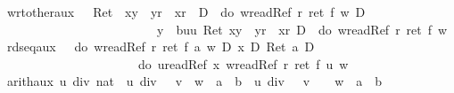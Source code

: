 \begin{isabellebody}
\isamarkupfalse%
\isamarkupfalse%
\isamarkupfalse%
\isanewline
\isanewline
\isamarkupfalse%
\ wrt{\isacharunderscore}other{}{\isacharunderscore}aux{\isacharcolon}\ \ {\isachardoublequote}{\isasymturnstile}\ Ret\ {\isacharparenleft}\ x{\isasymnoteq}y\ {\isasymand}\ y{\isasymnoteq}r\ {\isasymand}\ x{\isasymnoteq}r\ {\isacharparenright}\ {\isasymand}\isactrlsub D\ {\isasymUp}\ {\isacharparenleft}do\ {\isacharbraceleft}w{\isasymleftarrow}readRef\ r{\isacharsemicolon}\ ret\ {\isacharparenleft}f\ w{\isacharparenright}{\isacharbraceright}{\isacharparenright}\ {\isasymlongrightarrow}\isactrlsub D\ \isanewline
\ \ \ \ \ \ \ \ \ \ \ \ \ \ \ \ \ \ \ \ \ \ \ \ {\isacharbrackleft}{\isacharhash}\ y\ {\isacharcolon}{\isacharequal}\ b{\isacharbrackright}{\isacharparenleft}{\isasymlambda}uu{\isachardot}\ Ret\ {\isacharparenleft}x{\isasymnoteq}y\ {\isasymand}\ y{\isasymnoteq}r\ {\isasymand}\ x{\isasymnoteq}r{\isacharparenright}\ {\isasymand}\isactrlsub D\ {\isasymUp}\ {\isacharparenleft}do\ {\isacharbraceleft}w{\isasymleftarrow}readRef\ r{\isacharsemicolon}\ ret\ {\isacharparenleft}f\ w{\isacharparenright}{\isacharbraceright}{\isacharparenright}{\isacharparenright}{\isachardoublequote}\isamarkupfalse%
\isamarkupfalse%
\isamarkupfalse%
\isamarkupfalse%
\isamarkupfalse%
\isamarkupfalse%
\isamarkupfalse%
\isanewline
\isanewline
\isamarkupfalse%
\ rd{\isacharunderscore}seq{\isacharunderscore}aux{\isacharcolon}\ {\isachardoublequote}{\isasymturnstile}\ {\isasymUp}\ {\isacharparenleft}do\ {\isacharbraceleft}w{\isasymleftarrow}readRef\ r{\isacharsemicolon}\ ret\ {\isacharparenleft}f\ a\ w{\isacharparenright}{\isacharbraceright}{\isacharparenright}\ {\isasymand}\isactrlsub D\ {\isacharasterisk}x\ {\isacharequal}\isactrlsub D\ Ret\ a\ {\isasymlongrightarrow}\isactrlsub D\isanewline
\ \ \ \ \ \ \ \ \ \ \ \ \ \ \ \ \ \ \ \ \ {\isasymUp}\ {\isacharparenleft}do\ {\isacharbraceleft}u{\isasymleftarrow}readRef\ x{\isacharsemicolon}\ w{\isasymleftarrow}readRef\ r{\isacharsemicolon}\ ret\ {\isacharparenleft}f\ u\ w{\isacharparenright}{\isacharbraceright}{\isacharparenright}{\isachardoublequote}\isamarkupfalse%
\isamarkupfalse%
\isamarkupfalse%
\isamarkupfalse%
\isamarkupfalse%
\isamarkupfalse%
\isamarkupfalse%
\isamarkupfalse%
\isamarkupfalse%
\isanewline
\isanewline
\isamarkupfalse%
\ arith{}{\isacharunderscore}aux{\isacharcolon}\ {\isachardoublequote}{\isacharparenleft}u\ div\ {\isacharparenleft}{}{\isacharcolon}{\isacharcolon}nat{\isacharparenright}\ {\isacharplus}\ u\ div\ {}{\isacharparenright}\ {\isacharasterisk}\ v\ {\isacharplus}\ w\ {\isacharequal}\ a\ {\isacharasterisk}\ b\ {\isasymlongrightarrow}\ u\ div\ {}\ {\isacharasterisk}\ {\isacharparenleft}v\ {\isacharasterisk}\ {}{\isacharparenright}\ {\isacharplus}\ w\ {\isacharequal}\ a\ {\isacharasterisk}\ b{\isachardoublequote}\isamarkupfalse%

\end{isabellebody}
